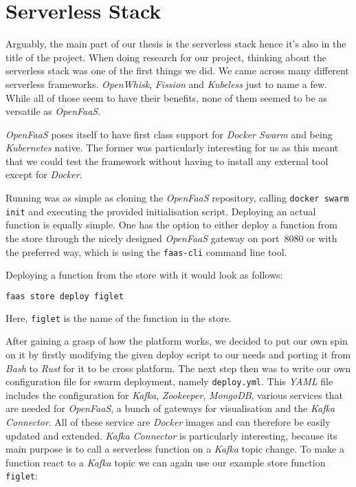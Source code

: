 \section{Serverless Stack}

Arguably, the main part of our thesis is the serverless stack hence it's also in the title of the
project. When doing research for our project, thinking about the serverless stack was one of the
first things we did. We came across many different serverless frameworks. \textit{OpenWhisk},
\textit{Fission} and \textit{Kubeless} just to name a few. While all of those seem to have their
benefits, none of them seemed to be as versatile as \textit{OpenFaaS}.

\textit{OpenFaaS} poses itself to have first class support for \textit{Docker Swarm} and being
\textit{Kubernetes} native. The former was particularly interesting for us as this meant that we
could test the framework without having to install any external tool except for  \textit{Docker}.

Running was as simple as cloning the \textit{OpenFaaS} repository, calling \texttt{docker swarm
init} and executing the provided initialisation script. Deploying an actual function is equally
simple. One has the option to either deploy a function from the store through the nicely designed
\textit{OpenFaaS} gateway on port~8080 or with the preferred way, which is using the
\texttt{faas-cli} command line tool.

Deploying a function from the store with it would look as follows:

\begin{lstlisting}[language=bash]
faas store deploy figlet
\end{lstlisting}

Here, \texttt{figlet} is the name of the function in the store.

After gaining a grasp of how the platform works, we decided to put our own spin on it by firstly
modifying the given deploy script to our needs and porting it from \textit{Bash} to \textit{Rust}
for it to be cross platform. The next step then was to write our own configuration file for swarm
deployment, namely \texttt{deploy.yml}. This \textit{YAML} file includes the configuration for
\textit{Kafka}, \textit{Zookeeper}, \textit{MongoDB}, various services that are needed for
\textit{OpenFaaS}, a bunch of gateways for visualisation and the \textit{Kafka Connector}. All of
these service are \textit{Docker} images and can therefore be easily updated and extended.
\textit{Kafka Connector} is particularly interesting, because its main purpose is to call a
serverless function on a \textit{Kafka} topic change. To make a function react to a \textit{Kafka} topic we can again
use our example store function \texttt{figlet}:

